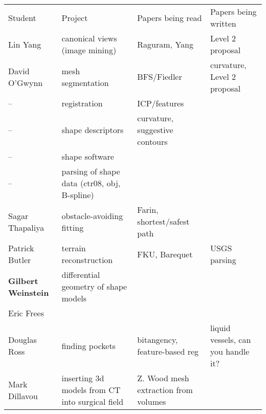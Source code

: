 \documentclass[10pt]{article}
\begin{document}
\begin{tabular}{llll} \hline
Student & Project & Papers being read & Papers being written \\
Lin Yang        & canonical views (image mining) & Raguram, Yang & Level 2 proposal \\
David O'Gwynn   & mesh segmentation & BFS/Fiedler & curvature, Level 2 proposal\\
--              & registration & ICP/features \\
--              & shape descriptors & curvature, suggestive contours \\
--              & shape software \\
--              & parsing of shape data (ctr08, obj, B-spline) \\
Sagar Thapaliya & obstacle-avoiding fitting & Farin, shortest/safest path  & \\
Patrick Butler  & terrain reconstruction & FKU, Barequet & USGS parsing \\
{\bf Gilbert Weinstein} & differential geometry of shape models \\
Eric Frees      & \\
Douglas Ross    & finding pockets & bitangency, feature-based reg 
                & liquid vessels, can you handle it?\\
Mark Dillavou   & {\tiny inserting 3d models from CT into surgical field} 
                & {\tiny Z. Wood mesh extraction from volumes} & \\ \hline
\end{tabular}
\end{document}
